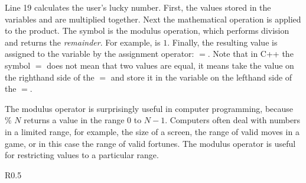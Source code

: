 

Line 19 calculates the user's lucky number.  First, the values stored in the variables  and  are multiplied together.  
Next the mathematical operation  is applied to the product.  The \cf{\%} symbol is the modulus operation, which performs division and returns the \emph{remainder}.  For example,  is $1$.  Finally, the resulting value is assigned to the variable  by the assignment operator: $=$.  Note that in C++ the symbol $=$ does not mean that two values are equal, it means take the value on the righthand side of the $=$ and store it in the variable on the lefthand side of the $=$.  

The modulus operator is surprisingly useful in computer programming, because \% $N$ returns a value in the range $0$ to $N-1$.  Computers often deal with numbers in a limited range, for example, the size of a screen, the range of valid moves in a game, or in this case the range of valid fortunes.  The modulus operator is useful for restricting values to a particular range.

\begin{wrapfigure}{R}{0.5\textwidth}\vspace{-0.3cm} 
\vspace{-0.5cm}
\end{wrapfigure}

